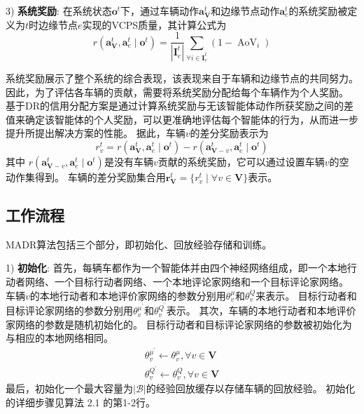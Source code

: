 3) \textbf{系统奖励}: 在系统状态$\boldsymbol{o}^{t}$下，通过车辆动作$\boldsymbol{a}_{\mathbf{V}}^{t}$和边缘节点动作$\boldsymbol{a}_{e}^{t}$的系统奖励被定义为$t$时边缘节点$e$实现的VCPS质量，其计算公式为
	\begin{equation}
		r\left(\boldsymbol{a}_{\mathbf{V}}^{t},\boldsymbol{a}_{e}^{t} \mid \boldsymbol{o}^{t}\right)=\frac{1}{\left|\mathbf{I}_e^t\right|} \sum_{\forall i \in \mathbf{I}_e^t}\left(1 -\operatorname{AoV}_{i} \right)
	\end{equation}
	
系统奖励展示了整个系统的综合表现，该表现来自于车辆和边缘节点的共同努力。
因此，为了评估各车辆的贡献，需要将系统奖励分配给每个车辆作为个人奖励。
基于DR的信用分配方案是通过计算系统奖励与无该智能体动作所获奖励之间的差值来确定该智能体的个人奖励，可以更准确地评估每个智能体的行为，从而进一步提升所提出解决方案的性能。
据此，车辆$v$的差分奖励表示为\cite{foerster2018counterfactual}
\begin{equation}
r_{v}^{t}=r\left(\boldsymbol{a}_{\mathbf{V}}^{t},\boldsymbol{a}_{e}^{t} \mid \boldsymbol{o}^{t}\right)-r\left(\boldsymbol{a}_{\mathbf{V}-v}^{t},\boldsymbol{a}_{e}^{t} \mid \boldsymbol{o}^{t}\right)
\end{equation}
\noindent 其中 $r\left(\boldsymbol{a}_{\mathbf{V}-v}^{t},\boldsymbol{a}_{e}^{t} \mid \boldsymbol{o}^{t}\right)$是没有车辆$v$贡献的系统奖励，它可以通过设置车辆$v$的空动作集得到。
车辆的差分奖励集合用$\boldsymbol{r}_{\mathbf{V}}^{t}=\{ r_{v}^{t} \mid \forall v \in \mathbf{V}\}$表示。

\subsection{工作流程}
MADR算法包括三个部分，即初始化、回放经验存储和训练。

1) \textbf{初始化}: 首先，每辆车都作为一个智能体并由四个神经网络组成，即一个本地行动者网络、一个目标行动者网络、一个本地评论家网络和一个目标评论家网络。
车辆$v$的本地行动者和本地评价家网络的参数分别用$\theta_{v}^{\mu}$和$\theta_{v}^{Q}$来表示。
目标行动者和目标评论家网络的参数分别用$\theta_{v}^{\mu^{\prime}}$和$\theta_{v}^{Q^{\prime}}$表示。
其次，车辆的本地行动者和本地评价家网络的参数是随机初始化的。
目标行动者和目标评论家网络的参数被初始化为与相应的本地网络相同。
\begin{align}
	\theta_{v}^{\mu^{\prime}} \leftarrow \theta_{v}^{\mu}, \forall v \in \mathbf{V}\\
	\theta_{v}^{Q^{\prime}} \leftarrow \theta_{v}^{Q}, \forall v \in \mathbf{V}
\end{align}
最后，初始化一个最大容量为$|\mathcal{B}|$的经验回放缓存以存储车辆的回放经验。
初始化的详细步骤见算法 2.1 的第1-2行。

